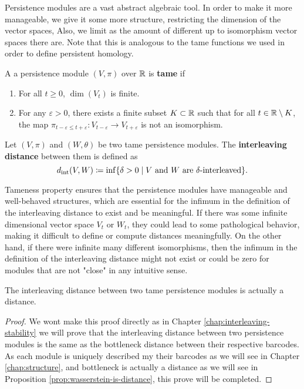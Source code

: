 Persistence modules are a vast abstract algebraic tool. In order to make it more manageable, we give it some more structure, restricting the dimension of the vector spaces, Also, we limit as the amount of different up to isomorphism vector spaces there are. Note that this is analogous to the tame functions we used in order to define persistent homology.

\begin{definition}
    A a persistence module $ (V, \pi) $ over $ \mathbb R $ is {\bf tame} if
    \begin{enumerate}
        \renewcommand{\labelenumi}{(\roman{enumi})}
        \item For all $ t \geq 0 $, $ \dim(V_t) $ is finite.
        \item For any $\varepsilon > 0 $, there exists a finite subset $ K \subset \mathbb R $ such that for all $ t \in \mathbb R \setminus K $, the map $ \pi_{t-\varepsilon \leq t+\varepsilon} \colon V_{t-\varepsilon} \to V_{t+\varepsilon} $ is not an isomorphism.
    \end{enumerate}
\end{definition}

\begin{definition} \label{def:interleaving-distance}
    Let $ (V, \pi) $ and $ (W, \theta) $ be two tame persistence modules. The {\bf interleaving distance} between them is defined as
    \begin{equation}
        d_{\operatorname{int}}(V, W) \coloneq \inf \{ \delta > 0 \mid V \text{ and } W \text{ are } \delta\text{-interleaved}\}.
    \end{equation}
\end{definition}

Tameness property ensures that the persistence modules have manageable and well-behaved structures, which are essential for the infimum in the definition of the interleaving distance to exist and be meaningful. If there was some infinite dimensional vector space $ V_t $ or $ W_t$, they could lead to some pathological behavior, making it difficult to define or compute distances meaningfully. On the other hand, if there were infinite many different isomorphisms, then the infimum in the definition of the interleaving distance might not exist or could be zero for modules that are not "close" in any intuitive sense.

\begin{proposition}
    The interleaving distance between two tame persistence modules is actually a distance.
\end{proposition}
\begin{proof}
    We wont make this proof directly as in Chapter \ref{chap:interleaving-stability} we will prove that the interleaving distance between two persistence modules is the same as the bottleneck distance between their respective barcodes. As each module is uniquely described my their barcodes as we will see in Chapter \ref{chap:structure}, and bottleneck is actually a distance as we will see in Proposition \ref{prop:wasserstein-is-distance}, this prove will be completed.
\end{proof}  

